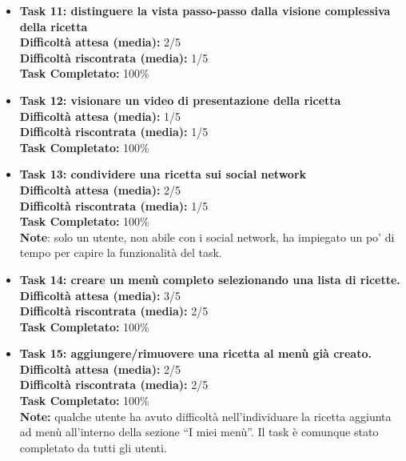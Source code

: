 \begin{itemize}
\item
\textbf{Task 11: distinguere la vista passo-passo dalla visione
complessiva della ricetta}\\
\textbf{Difficoltà attesa (media):} 2/5\\
\textbf{Difficoltà riscontrata (media):} 1/5\\
\textbf{Task Completato:} 100\%\\

\item
\textbf{Task 12: visionare un video di presentazione della ricetta}\\
\textbf{Difficoltà attesa (media):} 1/5\\
\textbf{Difficoltà riscontrata (media):} 1/5\\
\textbf{Task Completato:} 100\%\\

\item
\textbf{Task 13: condividere una ricetta sui social network}\\
\textbf{Difficoltà attesa (media):} 2/5\\
\textbf{Difficoltà riscontrata (media):} 1/5\\
\textbf{Task Completato:} 100\%\\
\textbf{Note}: solo un utente, non abile con i social network, ha
impiegato un po' di tempo per capire la funzionalità del task.\\

\item
\textbf{Task 14: creare un menù completo selezionando una lista di
ricette.}\\
\textbf{Difficoltà attesa (media):} 3/5\\
\textbf{Difficoltà riscontrata (media):} 2/5\\
\textbf{Task Completato:} 100\%\\

\item
\textbf{Task 15: aggiungere/rimuovere una ricetta al menù già creato.}\\
\textbf{Difficoltà attesa (media):} 2/5\\
\textbf{Difficoltà riscontrata (media):} 2/5\\
\textbf{Task Completato:} 100\%\\
\textbf{Note:} qualche utente ha avuto difficoltà nell'individuare la
ricetta aggiunta ad menù all'interno della sezione ``I miei menù''. Il
task è comunque stato completato da tutti gli utenti.\\


\end{itemize}

